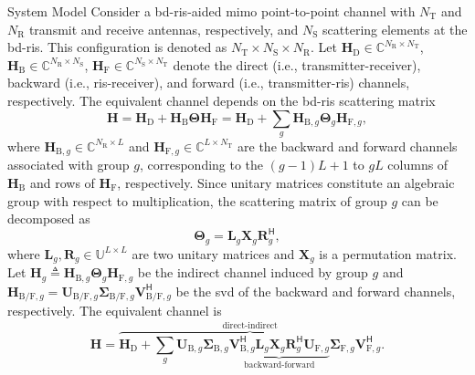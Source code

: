 \documentclass[journal]{IEEEtran}
\begin{document}
\begin{section}{System Model}
		Consider a \gls{bd}-\gls{ris}-aided \gls{mimo} point-to-point channel with $N_\mathrm{T}$ and $N_\mathrm{R}$ transmit and receive antennas, respectively, and $N_\mathrm{S}$ scattering elements at the \gls{bd}-\gls{ris}.
		This configuration is denoted as $N_\mathrm{T} \times N_\mathrm{S} \times N_\mathrm{R}$.
		Let $\mathbf{H}_\mathrm{D} \in \mathbb{C}^{N_\mathrm{R} \times N_\mathrm{T}}$, $\mathbf{H}_\mathrm{B} \in \mathbb{C}^{N_\mathrm{R} \times N_\mathrm{S}}$, $\mathbf{H}_\mathrm{F} \in \mathbb{C}^{N_\mathrm{S} \times N_\mathrm{T}}$ denote the direct (i.e., transmitter-receiver), backward (i.e., \gls{ris}-receiver), and forward (i.e., transmitter-\gls{ris}) channels, respectively.
		The equivalent channel depends on the \gls{bd}-\gls{ris} scattering matrix
		\begin{equation}
			\label{eq:channel}
			\mathbf{H} = \mathbf{H}_\mathrm{D} + \mathbf{H}_\mathrm{B} \mathbf{\Theta} \mathbf{H}_\mathrm{F} = \mathbf{H}_\mathrm{D} + \sum_g \mathbf{H}_{\mathrm{B},g} \mathbf{\Theta}_g \mathbf{H}_{\mathrm{F},g},
		\end{equation}
		where $\mathbf{H}_{\mathrm{B},g} \in \mathbb{C}^{N_\mathrm{R} \times L}$ and $\mathbf{H}_{\mathrm{F},g} \in \mathbb{C}^{L \times N_\mathrm{T}}$ are the backward and forward channels associated with group $g$, corresponding to the $(g{-}1)L{+}1$ to $gL$ columns of $\mathbf{H}_\mathrm{B}$ and rows of $\mathbf{H}_\mathrm{F}$, respectively.
		Since unitary matrices constitute an algebraic group with respect to multiplication, the scattering matrix of group $g$ can be decomposed as
		\begin{equation}
			\label{eq:ris_decompose_group}
			\mathbf{\Theta}_g = \mathbf{L}_g \mathbf{X}_g \mathbf{R}_g^\mathsf{H},
		\end{equation}
		where $\mathbf{L}_g, \mathbf{R}_g \in \mathbb{U}^{L \times L}$ are two unitary matrices and $\mathbf{X}_g$ is a permutation matrix.
		Let $\mathbf{H}_g \triangleq \mathbf{H}_{\mathrm{B},g} \mathbf{\Theta}_g \mathbf{H}_{\mathrm{F},g}$ be the indirect channel induced by group $g$ and $\mathbf{H}_{\mathrm{B/F},g} = \mathbf{U}_{\mathrm{B/F},g} \mathbf{\Sigma}_{\mathrm{B/F},g} \mathbf{V}_{\mathrm{B/F},g}^\mathsf{H}$ be the \gls{svd} of the backward and forward channels, respectively.
		The equivalent channel is
		\begin{equation}
			\label{eq:channel_svd}
			\mathbf{H} = \overbrace{\mathbf{H}_\mathrm{D} + \sum_g \mathbf{U}_{\mathrm{B},g} \mathbf{\Sigma}_{\mathrm{B},g} \underbrace{\mathbf{V}_{\mathrm{B},g}^\mathsf{H} \mathbf{L}_g \mathbf{X}_g \mathbf{R}_g^\mathsf{H} \mathbf{U}_{\mathrm{F},g}}_\text{backward-forward} \mathbf{\Sigma}_{\mathrm{F},g} \mathbf{V}_{\mathrm{F},g}^\mathsf{H}}^\text{direct-indirect}.
		\end{equation}


\end{section}
\end{document}
